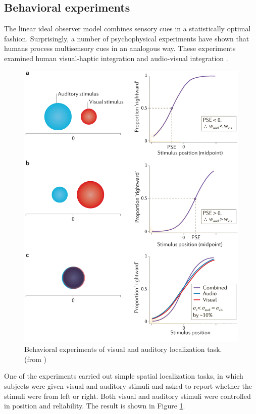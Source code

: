 \documentclass{article}[11pt]
\begin{document}
\subsection{Behavioral experiments}
The linear ideal observer model combines sensory cues in a statistically optimal fashion. Surprisingly, a number of psychophysical experiments have shown that humans process multisensory cues in an analogous way. These experiments examined human visual-haptic integration \cite{ernst_humans_2002} and audio-visual integration \cite{alais_ventriloquist_2004}.

\begin{figure}[tpb]
  \centering
  \includegraphics[width=.9\textwidth]{fetsch-visaudloc}
  \caption{Behavioral experiments of visual and auditory localization task. (from \cite{fetsch_bridging_2013})}
  \label{fig:visaudloc}
\end{figure}

One of the experiments \cite{alais_ventriloquist_2004} carried out simple spatial localization tasks, in which subjects were given visual and auditory stimuli and asked to report whether the stimuli were from left or right. Both visual and auditory stimuli were controlled in position and reliability. The result is shown in Figure \ref{fig:visaudloc}.
\end{document}
